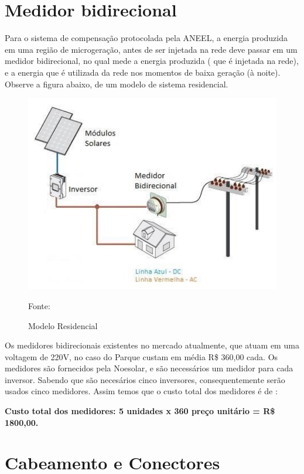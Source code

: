 \section{Medidor bidirecional}

	Para o sistema de compensa\c{c}\~ao protocolada pela ANEEL, a energia produzida em uma regi\~ao de microgera\c{c}\~ao, antes de ser injetada na rede deve passar em um medidor bidirecional, no qual mede a energia produzida ( que \'e injetada na rede), e a energia que \'e utilizada da rede nos momentos de baixa gera\c{c}\~ao (\`a noite). Observe a figura abaixo, de um modelo de sistema residencial.
	
\begin{figure}[H]
	\centering
	\label{ModeloResidencial}
		\includegraphics[keepaspectratio=true,scale=0.9]{figuras/ModeloResidencial.png}
	\caption{Modelo Residencial}
	\small{Fonte: \cite{SMARTLY} }
\end{figure}
	
	Os medidores bidirecionais existentes no mercado atualmente, que atuam em uma voltagem de 220V, no caso do Parque custam em m\'edia R\$ 360,00 cada. Os medidores s\~ao fornecidos pela Noesolar, e s\~ao necess\'arios  um medidor para cada inversor. Sabendo que s\~ao neces\'arios cinco inversores, consequentemente ser\~ao usados cinco medidores. Assim temos que o custo total dos medidores \'e de :
	
	\textbf{Custo total dos medidores: 5 unidades x 360 pre\c{c}o unit\'ario = R\$ 1800,00. }
	
\section{Cabeamento e Conectores}

